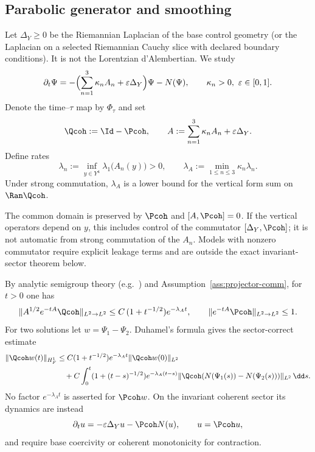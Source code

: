 \documentclass[11pt]{article}
\newcommand{\Yfour}{\ensuremath{Y^{4}}}
\newcommand{\Aop}{A}
\newcommand{\HoneF}{\ensuremath{H^{1}_{F}}}
\newcommand{\Ltwo}{\ensuremath{L^{2}}}
\begin{document}
\subsection{Parabolic generator and smoothing}
Let $\Delta_Y\ge0$ be the Riemannian Laplacian of the base control geometry
(or the Laplacian on a selected Riemannian Cauchy slice with declared boundary
conditions). It is not the Lorentzian d'Alembertian. We study
\begin{equation}\label{eq:flow}
\partial_t\Psi
= -\Bigl(\sum_{n=1}^{3}\kappa_n A_n + \varepsilon \Delta_{Y}\Bigr)\Psi
- N(\Psi),
\qquad
\kappa_n>0,\ \varepsilon\in[0,1].
\end{equation}
Denote the time--$\tau$ map by $\Phi_\tau$ and set
\[
\Qcoh := \Id-\Pcoh,
\qquad
\Aop := \sum_{n=1}^{3}\kappa_n A_n + \varepsilon \Delta_Y .
\]
Define rates
\[
\lambda_n := \inf_{y\in\Yfour}\lambda_1\!\big(A_n(y)\big)>0,
\qquad
\lambda_{\Aop} := \min_{1\le n\le 3}\kappa_n \lambda_n.
\]
Under strong commutation, $\lambda_{\Aop}$ is a lower bound for the vertical
form sum on $\Ran \Qcoh$.

\begin{assumption}\label{ass:projector-comm}
The common domain is preserved by $\Pcoh$ and $[\Aop,\Pcoh]=0$. If the vertical
operators depend on $y$, this includes control of the commutator
$[\Delta_Y,\Pcoh]$; it is not automatic from strong commutation of the
$A_n$. Models with nonzero commutator require explicit leakage terms and are
outside the exact invariant-sector theorem below.
\end{assumption}

By analytic semigroup theory (e.g.\ \cite{Amann1995,Henry1981}) and
Assumption~\ref{ass:projector-comm},
for $t>0$ one has
\begin{equation}\label{eq:semigroup}
\|\Aop^{1/2}e^{-t\Aop}\Qcoh\|_{\Ltwo\to\Ltwo}
\le C\,(1+t^{-1/2})e^{-\lambda_{\Aop}t},
\qquad
\|e^{-t\Aop}\Pcoh\|_{\Ltwo\to\Ltwo}\le 1.
\end{equation}
For two solutions let $w=\Psi_1-\Psi_2$. Duhamel's formula gives the
sector-correct estimate
\begin{align}
\|\Qcoh w(t)\|_{\HoneF}
&\le C(1+t^{-1/2})e^{-\lambda_{\Aop}t}
\|\Qcoh w(0)\|_{\Ltwo}\nonumber\\
&\quad+C\int_0^t(1+(t-s)^{-1/2})e^{-\lambda_{\Aop}(t-s)}
\|\Qcoh(N(\Psi_1(s))-N(\Psi_2(s)))\|_{\Ltwo}\,\dd s.
\label{eq:Q-duhamel}
\end{align}
No factor $e^{-\lambda_{\Aop}t}$ is asserted for $\Pcoh w$. On the invariant
coherent sector its dynamics are instead
\begin{equation}
\partial_t u=-\varepsilon\Delta_Yu-\Pcoh N(u),
\qquad u=\Pcoh u,
\label{eq:P-flow}
\end{equation}
and require base coercivity or coherent monotonicity for contraction.
\end{document}
